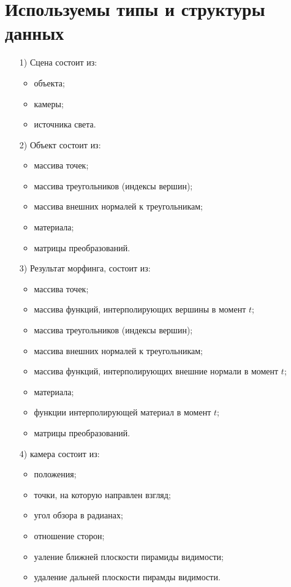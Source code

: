 \section{Используемы типы и структуры данных}
\begin{enumerate}
	\item[1)] Сцена состоит из:
	\begin{itemize}
		\item объекта;
		\item камеры;
		\item источника света.
	\end{itemize}
	
	\item[2)] Объект состоит из:
	\begin{itemize}
		\item массива точек;
		\item массива треугольников (индексы вершин);
		\item массива внешних нормалей к треугольникам;
		\item материала;
		\item матрицы преобразований.
	\end{itemize}
	
	\item[3)] Результат морфинга, состоит из:
	\begin{itemize}
		\item массива точек;
		\item массива функций, интерполирующих вершины в момент $t$;
		\item массива треугольников (индексы вершин);
		\item массива внешних нормалей к треугольникам;
		\item массива функций, интерполирующих внешние нормали в момент $t$;
		\item материала;
		\item функции интерполирующей материал в момент $t$;
		\item матрицы преобразований.
	\end{itemize}
	
	\item[4)] камера состоит из:
	\begin{itemize}
		\item положения;
		\item точки, на которую направлен взгляд;
		\item угол обзора в радианах;
		\item отношение сторон;
		\item уаление ближней плоскости пирамиды видимости;
		\item удаление дальней плоскости пирамды видимости.
	\end{itemize}
	

\end{enumerate}
